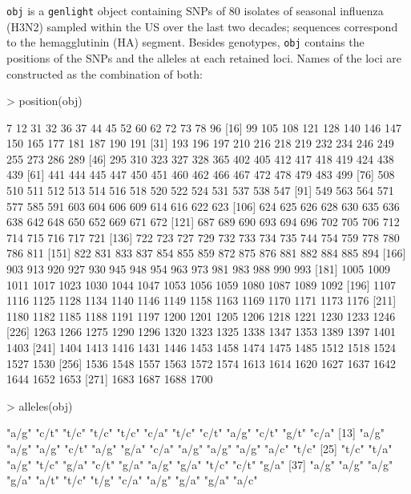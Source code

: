 \documentclass{article}
\begin{document}
\noindent \texttt{obj} is a \texttt{genlight} object containing SNPs of 80 isolates of seasonal
influenza (H3N2) sampled within the US over the last two decades; sequences correspond to the
hemagglutinin (HA) segment.
Besides genotypes, \texttt{obj} contains the positions of the SNPs and the alleles at each retained loci.
Names of the loci are constructed as the combination of both:
\begin{Schunk}
\begin{Sinput}
> position(obj)
\end{Sinput}
\begin{Soutput}
  [1]    7   12   31   32   36   37   44   45   52   60   62   72   73   78   96
 [16]   99  105  108  121  128  140  146  147  150  165  177  181  187  190  191
 [31]  193  196  197  210  216  218  219  232  234  246  249  255  273  286  289
 [46]  295  310  323  327  328  365  402  405  412  417  418  419  424  438  439
 [61]  441  444  445  447  450  451  460  462  466  467  472  478  479  483  499
 [76]  508  510  511  512  513  514  516  518  520  522  524  531  537  538  547
 [91]  549  563  564  571  577  585  591  603  604  606  609  614  616  622  623
[106]  624  625  626  628  630  635  636  638  642  648  650  652  669  671  672
[121]  687  689  690  693  694  696  702  705  706  712  714  715  716  717  721
[136]  722  723  727  729  732  733  734  735  744  754  759  778  780  786  811
[151]  822  831  833  837  854  855  859  872  875  876  881  882  884  885  894
[166]  903  913  920  927  930  945  948  954  963  973  981  983  988  990  993
[181] 1005 1009 1011 1017 1023 1030 1044 1047 1053 1056 1059 1080 1087 1089 1092
[196] 1107 1116 1125 1128 1134 1140 1146 1149 1158 1163 1169 1170 1171 1173 1176
[211] 1180 1182 1185 1188 1191 1197 1200 1201 1205 1206 1218 1221 1230 1233 1246
[226] 1263 1266 1275 1290 1296 1320 1323 1325 1338 1347 1353 1389 1397 1401 1403
[241] 1404 1413 1416 1431 1446 1453 1458 1474 1475 1485 1512 1518 1524 1527 1530
[256] 1536 1548 1557 1563 1572 1574 1613 1614 1620 1627 1637 1642 1644 1652 1653
[271] 1683 1687 1688 1700
\end{Soutput}
\begin{Sinput}
> alleles(obj)
\end{Sinput}
\begin{Soutput}
  [1] "a/g" "c/t" "t/c" "t/c" "t/c" "c/a" "t/c" "c/t" "a/g" "c/t" "g/t" "c/a"
 [13] "a/g" "a/g" "a/g" "c/t" "a/g" "g/a" "c/a" "a/g" "a/g" "a/g" "a/c" "t/c"
 [25] "t/c" "t/a" "a/g" "t/c" "g/a" "c/t" "g/a" "a/g" "g/a" "t/c" "c/t" "g/a"
 [37] "a/g" "a/g" "a/g" "g/a" "a/t" "t/c" "t/g" "c/a" "a/g" "g/a" "g/a" "a/c"

\end{Soutput}
\end{Schunk}
\end{document}
